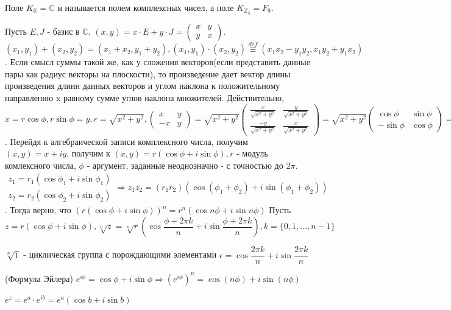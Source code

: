\begin{note}
	Поле \(K_{\mathbb{R}} = \mathbb{C}\) и называется полем комплексных чисел, а поле \(K_{\mathbb{Z}_3} = F_9\).
\end{note}
Пусть \(E, J\) - базис в \(\mathbb{C}\). \((x,y) = x\cdot E + y\cdot J = \begin{pmatrix}
	x & y \\ y & x
\end{pmatrix}\). \((x_1,y_1)+(x_2,y_2)=(x_1+x_2, y_1+y_2), (x_1,y_1)\cdot(x_2, y_2)\overset{def}{\equiv} (x_1x_2-y_1y_2, x_1y_2+y_1x_2)\). \newline
Если смысл суммы такой же, как у сложения векторов(если представить данные пары как радиус векторы на плоскости), то произведение дает вектор длины произведения длинн данных векторов и углом наклона к положительному направлению x равному сумме углов наклона множителей.\newline
 Действительно, \(x = r\cos \phi, r\sin \phi = y, r= \sqrt{x^2+y^2}, \begin{pmatrix}
x & y \\ -x & y
\end{pmatrix} = \sqrt{x^2+y^2}\begin{pmatrix}
\frac{x}{\sqrt{x^2+y^2}} & \frac{y}{\sqrt{x^2+y^2}} \\
\frac{-y}{\sqrt{x^2+y^2}} & \frac{x}{\sqrt{x^2+y^2}}
\end{pmatrix} = \sqrt{x^2+y^2}\begin{pmatrix}
\cos\phi & \sin \phi \\ -\sin\phi & \cos \phi
\end{pmatrix} = r\begin{pmatrix}
\cos\phi & \sin \phi \\ -\sin\phi & \cos \phi
\end{pmatrix}\). Перейдя к алгебраической записи комплексного числа, получим \((x,y) = x+iy\), получим к \((x,y ) = r(\cos\phi + i\sin\phi), r\) - модуль комлексного числа, $\phi$ - аргумент, заданные неоднозначно - с точностью до \(2\pi\). \newline
\(\begin{gathered}
	z_1 = r_1(\cos\phi_1+i\sin\phi_1) \\
	z_2 = r_2(\cos\phi_2+i\sin\phi_2)
\end{gathered} \Longrightarrow z_1z_2 = (r_1r_2)(\cos(\phi_1+\phi_2)+i\sin(\phi_1+\phi_2))\). Тогда верно, что \((r(\cos\phi+i\sin\phi))^n = r^n(\cos n\phi+i\sin n\phi)\) \newline
Пусть \(z = r(\cos\phi+i\sin\phi), \sqrt[n]{z}  = \sqrt[n]{r}(\cos\dfrac{\phi+2\pi k}{n}+i\sin\dfrac{{\phi + 2\pi k}}{n}), k = \{0, 1,\ldots, n-1\}\)
\begin{exercise}
	\(\sqrt[n]{1}\) - циклическая группа с порождающими элементами \(\epsilon = \cos\dfrac{2\pi k}{n}+i\sin\dfrac{2\pi k}{n}\)
\end{exercise}
\begin{theorem}
	(Формула Эйлера) \newline
	\(e^{i\phi}=\cos\phi+i\sin\phi \Longrightarrow (e^{i\phi})^n = \cos (n\phi)+i\sin( n\phi)\)
\end{theorem}
\(e^z = e^a\cdot e^{ib} = e^a(\cos b + i\sin b)\)